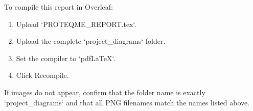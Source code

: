 \documentclass[12pt,a4paper]{report}
\begin{document}
To compile this report in Overleaf:

\begin{enumerate}
    \item Upload `PROTEQME_REPORT.tex`.
    \item Upload the complete `project_diagrams` folder.
    \item Set the compiler to `pdfLaTeX`.
    \item Click Recompile.
\end{enumerate}

If images do not appear, confirm that the folder name is exactly `project_diagrams` and that all PNG filenames match the names listed above.
\end{document}
